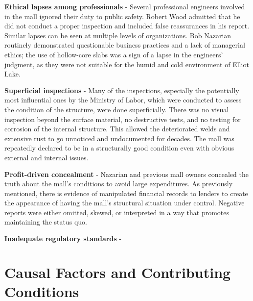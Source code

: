 \documentclass[12pt]{article}
\begin{document}
\textbf{Ethical lapses among professionals} - Several professional engineers involved in the mall ignored their duty to public safety. Robert Wood admitted that he did not conduct a proper inspection and included false reassurances in his report. Similar lapses can be seen at multiple levels of organizations. Bob Nazarian routinely demonstrated questionable business practices and a lack of managerial ethics; the use of hollow-core slabs was a sign of a lapse in the engineers' judgment, as they were not suitable for the humid and cold environment of Elliot Lake. 

\textbf{Superficial inspections} - Many of the inspections, especially the potentially most influential ones by the Ministry of Labor, which were conducted to assess the condition of the structure, were done superficially. There was no visual inspection beyond the surface material, no destructive tests, and no testing for corrosion of the internal structure. This allowed the deteriorated welds and extensive rust to go unnoticed and undocumented for decades. The mall was repeatedly declared to be in a structurally good condition even with obvious external and internal issues.

\textbf{Profit-driven concealment} - Nazarian and previous mall owners concealed the truth about the mall's conditions to avoid large expenditures. As previously mentioned, there is evidence of manipulated financial records to lenders to create the appearance of having the mall's structural situation under control. Negative reports were either omitted, skewed, or interpreted in a way that promotes maintaining the status quo.

\textbf{Inadequate regulatory standards} - 


\section{Causal Factors and Contributing Conditions}
\end{document}
